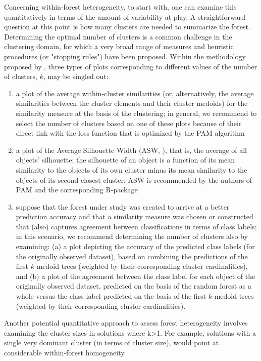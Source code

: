 Concerning within-forest heterogeneity, to start with, one can examine this quantitatively in terms of the amount of variability at play. A straightforward question at this point is how many clusters are needed to summarize the forest. Determining the optimal number of clusters is a common challenge in the clustering domain, for which a very broad range of measures and heuristic procedures (or "stopping rules") have been proposed. Within the methodology proposed by \citet{Sies2020}, three types of plots corresponding to different values of the number of clusters, $k$, may be singled out:
\begin{enumerate}
	\item a plot of the average within-cluster similarities (or, alternatively, the average similarities between the cluster elements and their cluster medoids) for the similarity measure at the basis of the clustering; in general, we recommend to select the number of clusters based on one of these plots because of their direct link with the loss function that is optimized by the PAM algorithm
	\item a plot of the Average Silhouette Width (ASW, \citep{Rousseeuw1987}), that is, the average of all objects' silhouette; the silhouette of an object is a function of its mean similarity to the objects of its own cluster minus its mean similarity to the objects of its second closest cluster; ASW is recommended by the authors of PAM and the corresponding R-package \citep{Kaufman2009, Maechler2019}
	\item  suppose that the forest under study was created to arrive at a better prediction accuracy and that a similarity measure was chosen or constructed that (also) captures agreement between classifications in terms of class labels; in this scenario, we recommend determining the number of clusters also by examining: (a) a plot depicting the accuracy of the predicted class labels (for the originally observed dataset), based on combining the predictions of the first $k$ medoid trees (weighted by their corresponding cluster cardinalities), and (b) a plot of the agreement between the class label for each object of the originally observed dataset, predicted on the basis of the random forest as a whole versus the class label predicted on the basis of the first $k$ medoid trees (weighted by their corresponding cluster cardinalities). \end{enumerate}
Another potential quantitative approach to assess forest heterogeneity involves examining the cluster sizes in solutions where k>1. For example, solutions with a single very dominant cluster (in terms of cluster size), would point at considerable within-forest homogeneity.

